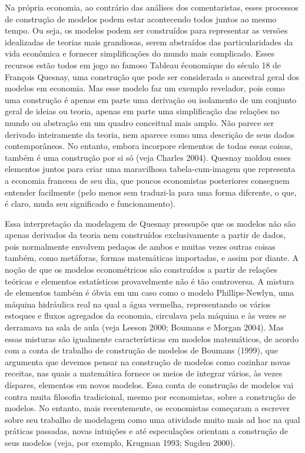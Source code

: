 \documentclass[12pt]{article}
\begin{document}
Na própria economia, ao contrário das análises dos comentaristas, esses processos de construção de modelos podem estar acontecendo todos juntos ao mesmo tempo. Ou seja, os modelos podem ser construídos para representar as versões idealizadas de teorias mais grandiosas, serem abstraídos das particularidades da vida econômica e fornecer simplificações do mundo mais complicado. Esses recursos estão todos em jogo no famoso Tableau économique do século 18 de François Quesnay, uma construção que pode ser considerada o ancestral geral dos modelos em economia. Mas esse modelo faz um exemplo revelador, pois como uma construção é apenas em parte uma derivação ou isolamento de um conjunto geral de ideias ou teoria, apenas em parte uma simplificação das relações no mundo ou abstração em um quadro conceitual mais amplo. Não parece ser derivado inteiramente da teoria, nem aparece como uma descrição de seus dados contemporâneos. No entanto, embora incorpore elementos de todas essas coisas, também é uma construção por si só (veja Charles 2004). Quesnay moldou esses elementos juntos para criar uma maravilhosa tabela-cum-imagem que representa a economia francesa de seu dia, que poucos economistas posteriores conseguem entender facilmente (pelo menos sem traduzi-la para uma forma diferente, o que, é claro, muda seu significado e funcionamento).

Essa interpretação da modelagem de Quesnay pressupõe que os modelos não são apenas derivados da teoria nem construídos exclusivamente a partir de dados, pois normalmente envolvem pedaços de ambos e muitas vezes outras coisas também, como metáforas, formas matemáticas importadas, e assim por diante. A noção de que os modelos econométricos são construídos a partir de relações teóricas e elementos estatísticos provavelmente não é tão controversa. A mistura de elementos também é óbvia em um caso como o modelo Phillips-Newlyn, uma máquina hidráulica real na qual a água vermelha, representando os vários estoques e fluxos agregados da economia, circulava pela máquina e às vezes se derramava na sala de aula (veja Leeson 2000; Boumans e Morgan 2004). Mas essas misturas são igualmente características em modelos matemáticos, de acordo com a conta de trabalho de construção de modelos de Boumans (1999), que argumenta que devemos pensar na construção de modelos como cozinhar novas receitas, nas quais a matemática fornece os meios de integrar vários, às vezes díspares, elementos em novos modelos. Essa conta de construção de modelos vai contra muita filosofia tradicional, mesmo por economistas, sobre a construção de modelos. No entanto, mais recentemente, os economistas começaram a escrever sobre seu trabalho de modelagem como uma atividade muito mais ad hoc na qual práticas passadas, novas intuições e até especulações orientam a construção de seus modelos (veja, por exemplo, Krugman 1993; Sugden 2000).
\end{document}
